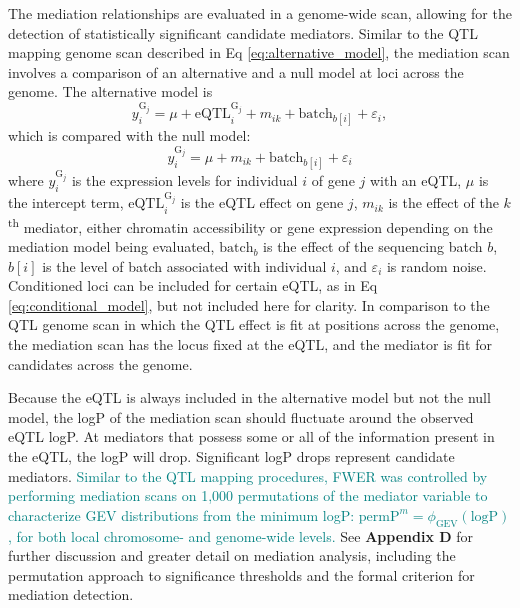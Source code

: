 \documentclass[9pt,twocolumn,twoside]{gsajnl}
\newcommand{\permpmed}{\text{permP}^{m}}
\newcommand{\GKinline}[1]{\textcolor{teal}{#1}}
\begin{document}
The mediation relationships are evaluated in a genome-wide scan, allowing for the detection of statistically significant candidate mediators. Similar to the QTL mapping genome scan described in Eq \ref{eq:alternative_model}, the mediation scan involves a comparison of an alternative and a null model at loci across the genome. The alternative model is
\begin{equation}
y^{\text{G}_{j}}_{i} = \mu + \text{eQTL}_{i}^{\text{G}_{j}} + m_{ik} + \text{batch}_{b[i]} + \varepsilon_{i},
\label{eq:mediation_alt}
\end{equation}
which is compared with the null model:
\begin{equation}
y^{\text{G}_{j}}_{i} = \mu + m_{ik} \nonumber + \text{batch}_{b[i]} + \varepsilon_{i}
\label{eq:mediation_null}
\end{equation}
where $y^{\text{G}_{j}}_{i}$ is the expression levels for individual $i$ of gene $j$ with an eQTL, $\mu$ is the intercept term, $\text{eQTL}_{i}^{\text{G}_{j}}$ is the eQTL effect on gene $j$, $m_{ik}$ is the effect of the $k$\textsuperscript{th} mediator, either chromatin accessibility or gene expression depending on the mediation model being evaluated, $\text{batch}_{b}$ is the effect of the sequencing batch $b$, $b[i]$ is the level of batch associated with individual $i$, and $\varepsilon_{i}$ is random noise. Conditioned loci can be included for certain eQTL, as in Eq \ref{eq:conditional_model}, but not included here for clarity. In comparison to the QTL genome scan in which the QTL effect is fit at positions across the genome, the mediation scan has the locus fixed at the eQTL, and the mediator is fit for candidates across the genome.

Because the eQTL is always included in the alternative model but not the null model, the logP of the mediation scan should fluctuate around the observed eQTL logP. At mediators that possess some or all of the information present in the eQTL, the logP will drop. Significant logP drops represent candidate mediators. \GKinline{Similar to the QTL mapping procedures, FWER was controlled by performing mediation scans on 1,000 permutations of the mediator variable to characterize GEV distributions from the minimum logP: $\permpmed = \phi_{\text{GEV}}(\text{logP})$, for both local chromosome- and genome-wide levels.} See \textbf{Appendix D} for further discussion and greater detail on mediation analysis, including the permutation approach to significance thresholds and the formal criterion for mediation detection.
\end{document}
